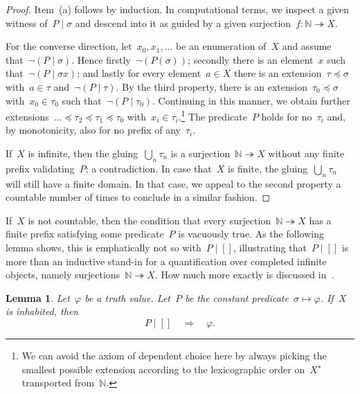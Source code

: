 \documentclass[com,11pt,crcready]{iosart2x}
\theoremstyle{definition}
\theoremstyle{plain}
\newtheorem{lemma}[definition]{Lemma}
\theoremstyle{remark}
\newcommand{\?}{\,{:}\,}
\newcommand{\NN}{\mathbb{N}}
\renewcommand{\_}{\mathpunct{.}\,}
\begin{document}
\begin{proof}
Item~(a) follows by induction. In computational terms, we inspect a given
witness of~$P \mid \sigma$ and descend into it as guided by a given
surjection~$f : \NN \twoheadrightarrow X$.

For the converse direction, let~$x_0,x_1,\ldots$ be an enumeration of~$X$ and
assume that~$\neg(P \mid \sigma)$. Hence firstly~$\neg(P(\sigma))$; secondly there is an
element~$x$ such that~$\neg(P \mid \sigma x)$; and lastly for every element~$a
\in X$ there is an extension~$\tau \preceq \sigma$ with~$a \in \tau$
and~$\neg(P \mid \tau)$. By the third property,
there is an extension~$\tau_0 \preceq
\sigma$ with~$x_0 \in \tau_0$ such that~$\neg(P \mid \tau_0)$. Continuing in
this manner, we obtain further extensions~$\ldots \preceq \tau_2 \preceq \tau_1
\preceq \tau_0$ with~$x_i \in \tau_i$.\footnote{We can avoid the axiom of
dependent choice here by always picking the smallest possible extension
according to the lexicographic order on~$X^\star$ transported from~$\NN$.}
The predicate~$P$ holds for no~$\tau_i$ and, by monotonicity, also for no
prefix of any~$\tau_i$.

If~$X$ is infinite, then the gluing~$\bigcup_n \tau_n$ is a surjection~$\NN
\twoheadrightarrow X$ without any finite prefix validating~$P$; a
contradiction. In case that~$X$ is finite, the gluing~$\bigcup_n \tau_n$ will
still have a finite domain. In that case, we appeal to the second property a
countable number of times to conclude in a similar fashion.
\end{proof}

If~$X$ is not countable, then the condition that every surjection~$\NN
\twoheadrightarrow X$ has a finite prefix satisfying some predicate~$P$ is
vacuously true. As the following lemma shows, this is emphatically not so
with~$P \mid []$, illustrating that~$P \mid []$ is more than an inductive
stand-in for a quantification over completed infinite objects, namely
surjections~$\NN \twoheadrightarrow X$. How much more exactly is discussed
in~\cite{blechschmidt:multiverse}.

\begin{lemma}Let~$\varphi$ be a truth value. Let~$P$ be the constant
predicate~$\sigma \mapsto \varphi$. If~$X$ is inhabited, then
\[ P \mid [] \quad\Longrightarrow\quad \varphi. \]
\end{lemma}
\end{document}
